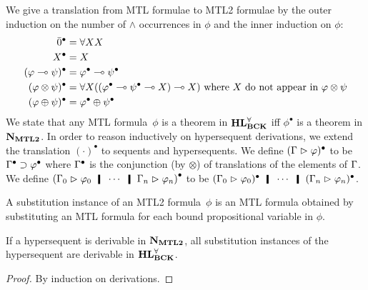 \documentclass[envcountsame]{llncs}
\begin{document}
We give a translation from MTL formulae to MTL2 formulae by the
outer
induction on the number of $\wedge$ occurrences in $\phi$
and the inner induction on $\phi$:
\begin{align*}
 \bar{0}^\bullet &= \forall XX \nonumber\\
 X^\bullet &= X \nonumber\\
 (\varphi\multimap\psi)^\bullet &= \varphi^\bullet \multimap \psi^\bullet\nonumber\\
 (\varphi\otimes\psi)^\bullet & = \forall
 X((\varphi^\bullet\multimap\psi^\bullet\multimap X)\multimap X) \text{ where }X\text{ do
 not appear in }\varphi\otimes\psi\nonumber\\
 (\varphi\oplus\psi)^\bullet &= \varphi^\bullet \oplus \psi^\bullet
\end{align*}
We state that any MTL formula~$\phi$ is a theorem in $\mathbf{HL}^\forall_{\mathbf{BCK}}$ iff
 $\phi^\bullet$ is a theorem in $\mathbf{N}_{\mathbf{MTL2}}$.
 In order to reason inductively on hypersequent derivations, we extend
 the translation $(\cdot)^\bullet$ to sequents and hypersequents.
 We define $(\Gamma\vartriangleright\varphi)^\bullet$ to be $\Gamma^\bullet\supset\varphi^\bullet$
 where
 $\Gamma^\bullet$ is the conjunction (by $\otimes$) of translations of the
 elements of $\Gamma$.
 We define
 $\left(\G_0\tr\phi_0\hmid\cdots\hmid\G_n\tr\phi_n\right)^\bullet$ to be
 $(\G_0\tr\phi_0)^\bullet\hmid\cdots \hmid (\G_n\tr\phi_n)^\bullet$.

A substitution instance of an MTL2 formula~$\phi$ is an MTL formula obtained by
substituting an MTL formula for each bound propositional variable in $\phi$.
 \begin{proposition}
  \label{prop:sound-ind}
  If a hypersequent is derivable in $\mathbf{N}_{\mathbf{MTL2}}$, all substitution instances
  of the hypersequent are derivable in $\mathbf{HL}^\forall_{\mathbf{BCK}}$.
 \end{proposition}
  \begin{proof}
   By induction on derivations.
  \end{proof}
\end{document}
